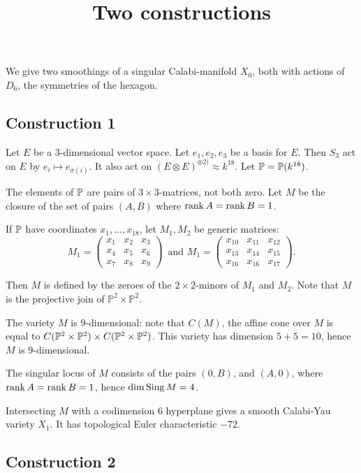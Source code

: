 \documentclass[11pt, english]{article}
\begin{document}
\title{Two constructions}
\date{}
\maketitle

We give two smoothings of a singular Calabi-manifold $X_0$, both with actions of $D_6$, the symmetries of the hexagon.

\subsection{Construction 1}

Let $E$ be a 3-dimensional vector space. Let $e_1,e_2,e_3$ be a basis for $E$. Then $S_3$ act on $E$ by $e_i \mapsto e_{\sigma(i)}$. It also act on $(E \otimes E)^{\oplus 2)}\approx k^{18}$. Let $\mathbb{P}=\mathbb{P}(k^{18})$.

The elements of $\mathbb{P}$ are pairs of $3 \times 3$-matrices, not both zero. Let $M$ be the closure of the set of pairs $(A,B)$ where $\operatorname{\mathrm{rank}} A = \operatorname{\mathrm{rank}} B = 1$. 

If $\mathbb{P}$ have coordinates $x_1,\ldots,x_{18}$, let $M_1, M_2$ be generic matrices:
\[
M_1 = \begin{pmatrix}
x_1 & x_2 & x_3 \\
x_4 & x_5 & x_6 \\
x_7 & x_8 & x_9 
\end{pmatrix}\,
\text{ and }
M_1 = \begin{pmatrix}
x_{10} & x_{11} & x_{12} \\
x_{13} & x_{14} & x_{15} \\
x_{16} & x_{16} & x_{17}
\end{pmatrix}.
\]

Then $M$ is defined by the zeroes of the $2 \times 2$-minors of $M_1$ and $M_2$. Note that $M$ is the projective join of $\mathbb P^2 \times \mathbb P^2$. 

The variety $M$ is $9$-dimensional: note that $C(M)$, the affine cone over $M$ is equal to $C(\mathbb P^2 \times \mathbb{P}^2) \times C(\mathbb P^2 \times \mathbb{P}^2)$. This variety has dimension $5+5=10$, hence $M$ is $9$-dimensional. 

The singular locus of $M$ consists of the pairs $(0,B)$, and $(A,0)$, where $\operatorname{\mathrm{rank}} A= \operatorname{\mathrm{rank}} B = 1$, hence $\dim \operatorname{Sing} M = 4$.

Intersecting $M$ with a codimension $6$ hyperplane gives a smooth Calabi-Yau variety $X_1$. It has topological Euler characteristic $-72$. 

\subsection{Construction 2}
\end{document}
